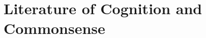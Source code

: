 \chapter{Literature of Cognition and Commonsense}\label{ch:literature_of_cognition_and_commonsense}

